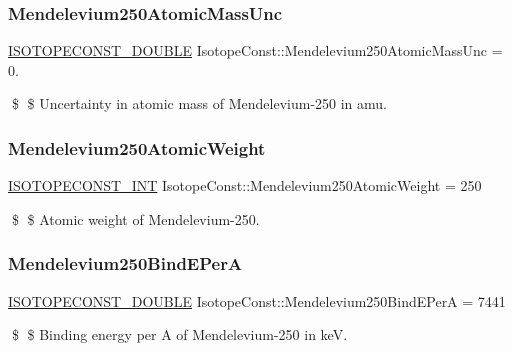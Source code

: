 \subsubsection{\texorpdfstring{Mendelevium250\+Atomic\+Mass\+Unc}{Mendelevium250AtomicMassUnc}}
{\footnotesize\ttfamily \mbox{\hyperlink{group___isotope_const-_macros_ga8f45a7272ce02c0b4c65c44636ed719a}{I\+S\+O\+T\+O\+P\+E\+C\+O\+N\+S\+T\+\_\+\+D\+O\+U\+B\+LE}} Isotope\+Const\+::\+Mendelevium250\+Atomic\+Mass\+Unc = 0.}

\$ \$ Uncertainty in atomic mass of Mendelevium-\/250 in amu. \mbox{\label{group___isotope_const-_mendelevium-_md250_gad0cbd0f39a971da059d7477ff8bd304c}} 
\subsubsection{\texorpdfstring{Mendelevium250\+Atomic\+Weight}{Mendelevium250AtomicWeight}}
{\footnotesize\ttfamily \mbox{\hyperlink{group___isotope_const-_macros_ga5f18360b3e99483a35c32d789e62621c}{I\+S\+O\+T\+O\+P\+E\+C\+O\+N\+S\+T\+\_\+\+I\+NT}} Isotope\+Const\+::\+Mendelevium250\+Atomic\+Weight = 250}

\$ \$ Atomic weight of Mendelevium-\/250. \mbox{\label{group___isotope_const-_mendelevium-_md250_ga13113c12cda17002989d2beb8eaf7b9d}} 
\subsubsection{\texorpdfstring{Mendelevium250\+Bind\+E\+PerA}{Mendelevium250BindEPerA}}
{\footnotesize\ttfamily \mbox{\hyperlink{group___isotope_const-_macros_ga8f45a7272ce02c0b4c65c44636ed719a}{I\+S\+O\+T\+O\+P\+E\+C\+O\+N\+S\+T\+\_\+\+D\+O\+U\+B\+LE}} Isotope\+Const\+::\+Mendelevium250\+Bind\+E\+PerA = 7441}

\$ \$ Binding energy per A of Mendelevium-\/250 in keV. \mbox{\label{group___isotope_const-_mendelevium-_md250_gad1c4c5efbc2fd4a141489d53e1a8344a}} 
